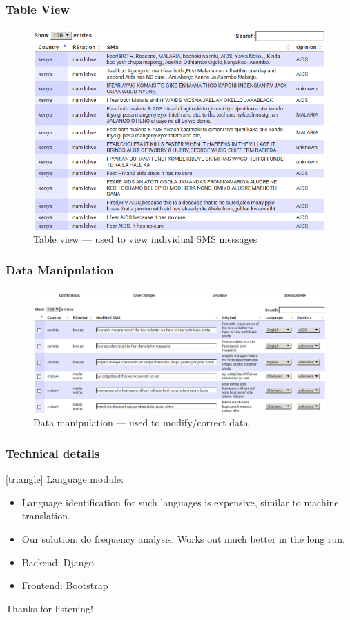 \documentclass{beamer}
\begin{document}
\begin{frame}
\frametitle{Table View}
  \begin{figure}
    \centering
    \includegraphics[scale=0.3]{./table.png}
    \caption{Table view --- used to view individual SMS messages}
  \end{figure}
\end{frame}

\begin{frame}
\frametitle{Data Manipulation}
  \begin{figure}
    \centering
    \includegraphics[scale=0.3]{./manip.png}
    \caption{Data manipulation --- used to modify/correct data}
  \end{figure}
\end{frame}


\begin{frame}
\frametitle{Technical details}
[triangle]
Language module:
\begin{itemize}[<+->]
\item Language identification for such languages is expensive, similar to machine translation.
\item Our solution: do frequency analysis. Works out much better in the long run.
\end{itemize}
\begin{itemize}[<+->]
\item Backend: Django
\item Frontend: Bootstrap
\end{itemize}
\end{frame}

\begin{frame}[c]
\begin{center}
\Huge Thanks for listening!
\end{center}
\end{frame}
\end{document}
